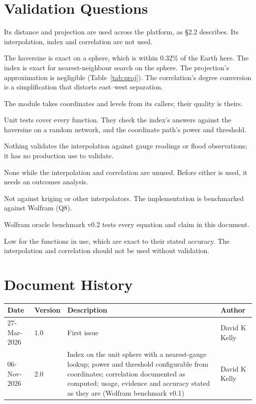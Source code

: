\documentclass[11pt,a4paper]{article}
\renewcommand{\mkmhistorypage}[1]{%
    \section{Document History}
    \begin{table}[ht]
        \centering
        \begin{tabular}{l|l|p{9cm}|l}
            \textbf{Date} & \textbf{Version} & \textbf{Description} & \textbf{Author} \\
            \hline
            #1
        \end{tabular}
    \end{table}
}
\begin{document}
\section{Validation Questions}

Its distance and projection are used across the platform, as \S2.2 describes. Its
interpolation, index and correlation are not used.

The haversine is exact on a sphere, which is within 0.32\% of the Earth here. The index is
exact for nearest-neighbour search on the sphere. The projection's approximation is
negligible (Table~\ref{tab:proj}). The correlation's degree conversion is a simplification
that distorts east--west separation.

The module takes coordinates and levels from its callers; their quality is theirs.

Unit tests cover every function. They check the index's answers against the haversine on a
random network, and the coordinate path's power and threshold.

Nothing validates the interpolation against gauge readings or flood observations; it has no
production use to validate.

None while the interpolation and correlation are unused. Before either is used, it needs
an outcomes analysis.

Not against kriging or other interpolators. The implementation is benchmarked against
Wolfram (Q8).

Wolfram oracle benchmark v0.2 tests every equation and claim in this document.

Low for the functions in use, which are exact to their stated accuracy. The interpolation
and correlation should not be used without validation.

\mkmhistorypage{27-Mar-2026 & 1.0 & First issue & David K Kelly \\
06-Nov-2026 & 2.0 & Index on the unit sphere with a nearest-gauge lookup; power and
threshold configurable from coordinates; correlation documented as computed; usage,
evidence and accuracy stated as they are (Wolfram benchmark v0.1) & David K Kelly \\}
\end{document}
